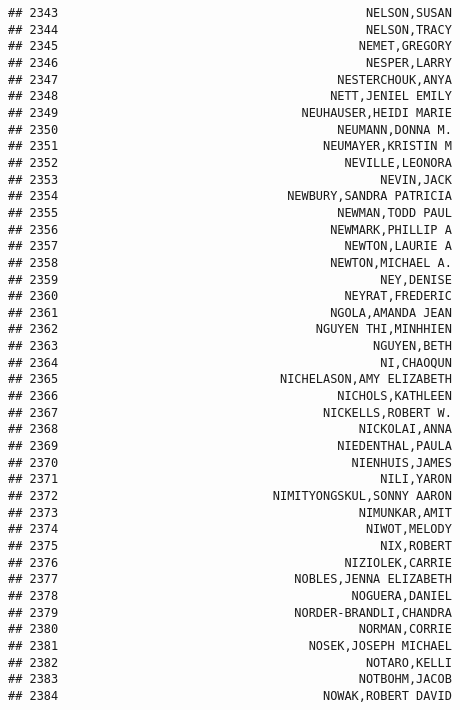 \documentclass[
]{article}
\begin{document}
\begin{verbatim}
## 2343                                           NELSON,SUSAN
## 2344                                           NELSON,TRACY
## 2345                                          NEMET,GREGORY
## 2346                                           NESPER,LARRY
## 2347                                       NESTERCHOUK,ANYA
## 2348                                      NETT,JENIEL EMILY
## 2349                                  NEUHAUSER,HEIDI MARIE
## 2350                                       NEUMANN,DONNA M.
## 2351                                     NEUMAYER,KRISTIN M
## 2352                                        NEVILLE,LEONORA
## 2353                                             NEVIN,JACK
## 2354                                NEWBURY,SANDRA PATRICIA
## 2355                                       NEWMAN,TODD PAUL
## 2356                                      NEWMARK,PHILLIP A
## 2357                                        NEWTON,LAURIE A
## 2358                                      NEWTON,MICHAEL A.
## 2359                                             NEY,DENISE
## 2360                                        NEYRAT,FREDERIC
## 2361                                      NGOLA,AMANDA JEAN
## 2362                                    NGUYEN THI,MINHHIEN
## 2363                                            NGUYEN,BETH
## 2364                                             NI,CHAOQUN
## 2365                               NICHELASON,AMY ELIZABETH
## 2366                                       NICHOLS,KATHLEEN
## 2367                                     NICKELLS,ROBERT W.
## 2368                                          NICKOLAI,ANNA
## 2369                                       NIEDENTHAL,PAULA
## 2370                                         NIENHUIS,JAMES
## 2371                                             NILI,YARON
## 2372                              NIMITYONGSKUL,SONNY AARON
## 2373                                          NIMUNKAR,AMIT
## 2374                                           NIWOT,MELODY
## 2375                                             NIX,ROBERT
## 2376                                        NIZIOLEK,CARRIE
## 2377                                 NOBLES,JENNA ELIZABETH
## 2378                                         NOGUERA,DANIEL
## 2379                                 NORDER-BRANDLI,CHANDRA
## 2380                                          NORMAN,CORRIE
## 2381                                   NOSEK,JOSEPH MICHAEL
## 2382                                           NOTARO,KELLI
## 2383                                          NOTBOHM,JACOB
## 2384                                     NOWAK,ROBERT DAVID

\end{verbatim}
\end{document}
